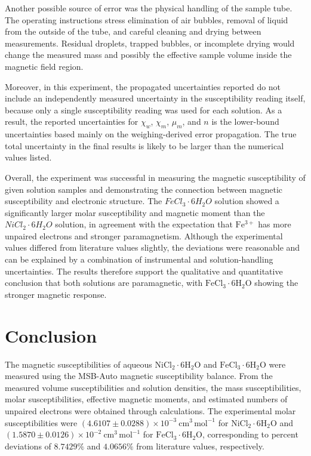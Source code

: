 \documentclass[12pt]{article}
\begin{document}
Another possible source of error was the physical handling of the sample tube. The operating instructions stress elimination of air bubbles, removal of liquid from the outside of the tube, and careful cleaning and drying between measurements. Residual droplets, trapped bubbles, or incomplete drying would change the measured mass and possibly the effective sample volume inside the magnetic field region. 

Moreover, in this experiment, the propagated uncertainties reported do not include an independently measured uncertainty in the susceptibility reading itself, because only a single susceptibility reading was used for each solution. As a result, the reported uncertainties for \(\chi_w\), \(\chi_m\), \(\mu_m\), and \(n\) is the lower-bound uncertainties based mainly on the weighing-derived error propagation. The true total uncertainty in the final results is likely to be larger than the numerical values listed.

Overall, the experiment was successful in measuring the magnetic susceptibility of given solution samples and demonstrating the connection between magnetic susceptibility and electronic structure. The $FeCl_3\cdot 6H_2O$ solution showed a significantly larger molar susceptibility and magnetic moment than the $NiCl_2\cdot 6H_2O$ solution, in agreement with the expectation that \(\mathrm{Fe^{3+}}\) has more unpaired electrons and stronger paramagnetism. Although the experimental values differed from literature values slightly, the deviations were reasonable and can be explained by a combination of instrumental and solution-handling uncertainties. The results therefore support the qualitative and quantitative conclusion that both solutions are paramagnetic, with \(\mathrm{FeCl_3\cdot 6H_2O}\) showing the stronger magnetic response.


\section*{Conclusion}
The magnetic susceptibilities of aqueous \(\mathrm{NiCl_2\cdot 6H_2O}\) and \(\mathrm{FeCl_3\cdot 6H_2O}\) were measured using the MSB-Auto magnetic susceptibility balance. From the measured volume susceptibilities and solution densities, the mass susceptibilities, molar susceptibilities, effective magnetic moments, and estimated numbers of unpaired electrons were obtained through calculations. The experimental molar susceptibilities were \((4.6107 \pm 0.0288)\times10^{-3}\ \mathrm{cm^3\,mol^{-1}}\) for \(\mathrm{NiCl_2\cdot 6H_2O}\) and \((1.5870 \pm 0.0126)\times10^{-2}\ \mathrm{cm^3\,mol^{-1}}\) for \(\mathrm{FeCl_3\cdot 6H_2O}\), corresponding to percent deviations of \(8.7429\%\) and \(4.0656\%\) from literature values, respectively. 
\end{document}
